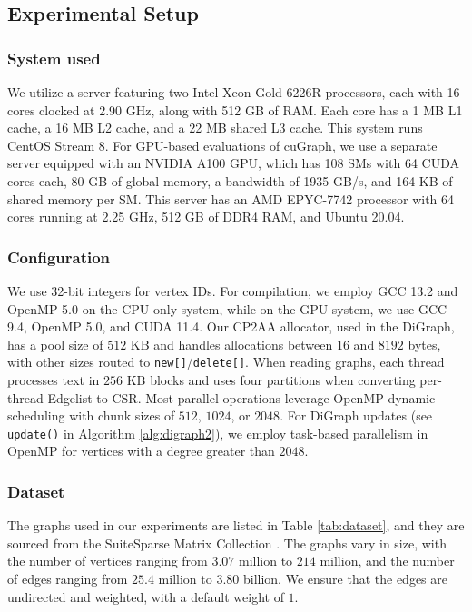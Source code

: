 \subsection{Experimental Setup}
\label{sec:setup}

\subsubsection{System used}
\label{sec:system}

We utilize a server featuring two Intel Xeon Gold 6226R processors, each with 16 cores clocked at 2.90 GHz, along with 512 GB of RAM. Each core has a 1 MB L1 cache, a 16 MB L2 cache, and a 22 MB shared L3 cache. This system runs CentOS Stream 8. For GPU-based evaluations of cuGraph, we use a separate server equipped with an NVIDIA A100 GPU, which has 108 SMs with 64 CUDA cores each, 80 GB of global memory, a bandwidth of 1935 GB/s, and 164 KB of shared memory per SM. This server has an AMD EPYC-7742 processor with 64 cores running at 2.25 GHz, 512 GB of DDR4 RAM, and Ubuntu 20.04.


\subsubsection{Configuration}
\label{sec:configuration}

We use 32-bit integers for vertex IDs. For compilation, we employ GCC 13.2 and OpenMP 5.0 on the CPU-only system, while on the GPU system, we use GCC 9.4, OpenMP 5.0, and CUDA 11.4. Our CP2AA allocator, used in the DiGraph, has a pool size of $512$ KB and handles allocations between $16$ and $8192$ bytes, with other sizes routed to \texttt{new[]}/\texttt{delete[]}. When reading graphs, each thread processes text in $256$ KB blocks and uses four partitions when converting per-thread Edgelist to CSR. Most parallel operations leverage OpenMP dynamic scheduling with chunk sizes of $512$, $1024$, or $2048$. For DiGraph updates (see \texttt{update()} in Algorithm \ref{alg:digraph2}), we employ task-based parallelism in OpenMP for vertices with a degree greater than $2048$.


\subsubsection{Dataset}
\label{sec:dataset}

The graphs used in our experiments are listed in Table \ref{tab:dataset}, and they are sourced from the SuiteSparse Matrix Collection \cite{suite19}. The graphs vary in size, with the number of vertices ranging from $3.07$ million to $214$ million, and the number of edges ranging from $25.4$ million to $3.80$ billion. We ensure that the edges are undirected and weighted, with a default weight of $1$.

